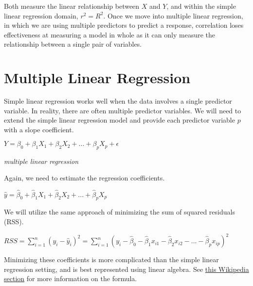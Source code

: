\documentclass[]{book}
\theoremstyle{definition}
\theoremstyle{definition}
\theoremstyle{definition}
\theoremstyle{remark}
\begin{document}
Both measure the linear relationship between \(X\) and \(Y\), and within
the simple linear regression domain, \(r^2 = R^2\). Once we move into
multiple linear regression, in which we are using multiple predictors to
predict a response, correlation loses effectiveness at measuring a model
in whole as it can only measure the relationship between a single pair
of variables.

\section{Multiple Linear Regression}\label{multiple-linear-regression}

Simple linear regression works well when the data involves a single
predictor variable. In reality, there are often multiple predictor
variables. We will need to extend the simple linear regression model and
provide each predictor variable \(p\) with a slope coefficient.

\(Y = \beta_0 + \beta_1X_1 + \beta_2X_2 + ... + \beta_pX_p + \epsilon\)

\emph{multiple linear regression}

Again, we need to estimate the regression coefficients.

\(\hat y = \hat\beta_0 + \hat\beta_1X_1 + \hat\beta_2X_2 + ... + \hat\beta_pX_p\)

We will utilize the same approach of minimizing the sum of squared
residuals (RSS).

\(RSS = \sum_{i=1}^{n}(y_i - \hat y_i)^2 = \sum_{i=1}^{n}(y_i - \hat\beta_0 - \hat\beta_1x_{i1} - \hat\beta_2x_{i2} - ... - \hat\beta_px_{ip})^2\)

Minimizing these coefficients is more complicated than the simple linear
regression setting, and is best represented using linear algebra. See
\href{https://en.wikipedia.org/wiki/Residual_sum_of_squares\#Matrix_expression_for_the_OLS_residual_sum_of_squares}{this
Wikipedia section} for more information on the formula.
\end{document}
